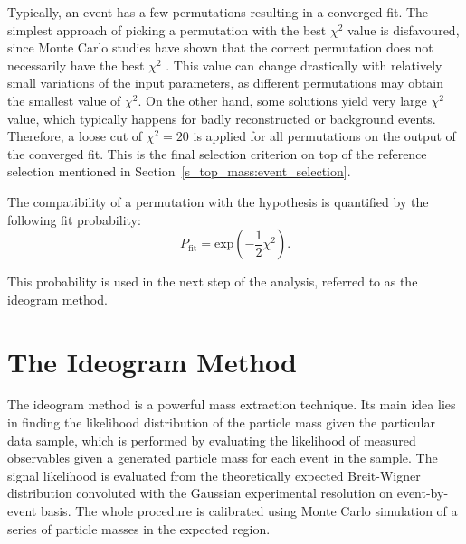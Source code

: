 Typically, an event has a few permutations resulting in a converged fit. The simplest approach of picking a permutation
with the best $\chi^2$ value is disfavoured, since Monte Carlo studies have shown that the correct permutation does not
necessarily have the best $\chi^2$ \autocite{Snyder}. This value can change drastically with relatively small variations
of the input parameters, as different permutations may obtain the smallest value of $\chi^2$. On the other hand, some
solutions yield very large $\chi^2$ value, which typically happens for badly reconstructed or background events.
Therefore, a loose cut of $\chi^2=20$ is applied for all permutations on the output of the converged fit. This is the
final selection criterion on top of the reference selection mentioned in Section~\ref{s_top_mass:event_selection}.


The compatibility of a permutation with the \ttbar hypothesis is quantified by the following fit probability:
\begin{equation}
	P_{\textrm{fit}} = \textrm{exp}(-\frac{1}{2}\chi^2).
	\label{eq:fit_probability}
\end{equation}

This probability is used in the next step of the analysis, referred to as the ideogram method.

\section{The Ideogram Method}
\label{s_top_mass:ideogram_method}

The ideogram method is a powerful mass extraction technique. Its main idea lies in finding the likelihood distribution
of the particle mass given the particular data sample, which is performed by evaluating the likelihood of measured
observables given a generated particle mass for each event in the sample. The signal likelihood is evaluated from the
theoretically expected Breit-Wigner distribution convoluted with the Gaussian experimental resolution on event-by-event
basis. The whole procedure is calibrated using Monte Carlo simulation of a series of particle masses in the expected
region.


